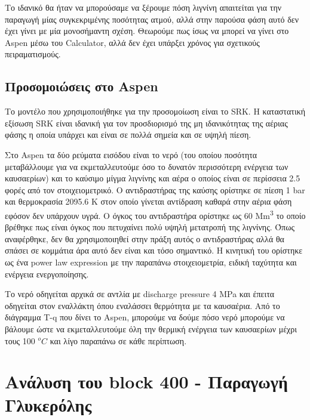\documentclass[11pt]{article}
\begin{document}
Το ιδανικό θα ήταν να μπορούσαμε να ξέρουμε πόση λιγνίνη απαιτείται για την παραγωγή μίας συγκεκριμένης ποσότητας ατμού, αλλά στην παρούσα φάση αυτό δεν έχει γίνει με μία μονοσήμαντη σχέση. Θεωρούμε πως ίσως να μπορεί να γίνει στο Aspen μέσω του Calculator, αλλά δεν έχει υπάρξει χρόνος για σχετικούς πειραματισμούς.

\subsection{Προσομοιώσεις στο Aspen}
\label{sec:org23f635c}
Το μοντέλο που χρησιμοποιήθηκε για την προσομοίωση είναι το SRK. Η καταστατική εξίσωση SRK είναι ιδανική για τον προσδιορισμό της μη ιδανικότητας της αέριας φάσης η οποία υπάρχει και είναι σε πολλά σημεία και σε υψηλή πίεση.

Στο Aspen τα δύο ρεύματα εισόδου είναι το νερό (του οποίου ποσότητα μεταβάλλουμε για να εκμεταλλευτούμε όσο το δυνατόν περισσότερη ενέργεια των καυσαερίων) και το καύσιμο μίγμα λιγνίνης και αέρα ο οποίος είναι σε περίσσεια 2.5 φορές από τον στοιχειομετρικό. Ο αντιδραστήρας της καύσης ορίστηκε σε πίεση 1 bar και θερμοκρασία 2095.6 Κ στον οποίο γίνεται αντίδραση καθαρά στην αέρια φάση εφόσον δεν υπάρχουν υγρά. Ο όγκος του αντιδραστήρα ορίστηκε ως 60 Mm\textsuperscript{3} το οποίο βρέθηκε πως είναι όγκος που πετυχαίνει πολύ υψηλή μετατροπή της λιγνίνης. Όπως αναφέρθηκε, δεν θα χρησιμοποιηθεί στην πράξη αυτός ο αντιδραστήρας αλλά θα σπάσει σε κομμάτια άρα αυτό δεν είναι και τόσο σημαντικό. Η κινητική του ορίστηκε ως ένα power law expression με την παραπάνω στοιχειομετρία, ειδική ταχύτητα και ενέργεια ενεργοποίησης.

Το νερό οδηγείται αρχικά σε αντλία με discharge pressure 4 MPa και έπειτα οδηγείται στον εναλλάκτη όπου εναλάσσει θερμότητα με τα καυσαέρια. Από το διάγραμμα T-q που δίνει το Aspen, μπορούμε να δούμε πόσο νερό μπορούμε να βάλουμε ώστε να εκμεταλλευτούμε όλη την θερμική ενέργεια των καυσαερίων μέχρι τους 100 \(^oC\) και λίγο παραπάνω σε κάθε περίπτωση.

\section{Ανάλυση του block 400 - Παραγωγή Γλυκερόλης}
\label{sec:org3208e0b}
\end{document}
